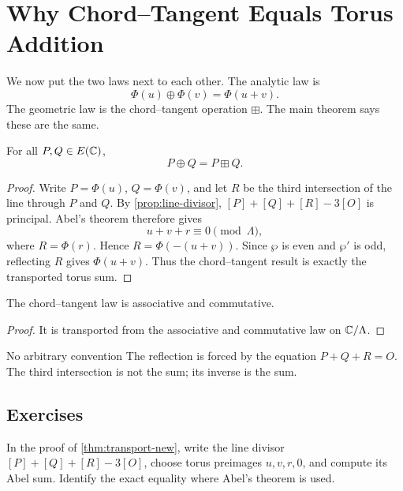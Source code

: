 \chapter{Why Chord--Tangent Equals Torus Addition}
\label{ch:transport}

We now put the two laws next to each other.  The analytic law is
\[
  \Phi(u)\oplus\Phi(v)=\Phi(u+v).
\]
The geometric law is the chord--tangent operation \(\boxplus\).  The main theorem
says these are the same.

\begin{theorem}
\label{thm:transport-new}
For all \(P,Q\in E(\mathbb{C})\),
\[
  P\oplus Q=P\boxplus Q.
\]
\end{theorem}

\begin{proof}
Write \(P=\Phi(u)\), \(Q=\Phi(v)\), and let \(R\) be the third intersection of the
line through \(P\) and \(Q\).  By \cref{prop:line-divisor},
\([P]+[Q]+[R]-3[O]\) is principal.  Abel's theorem therefore gives
\[
  u+v+r\equiv 0 \pmod{\Lambda},
\]
where \(R=\Phi(r)\).  Hence \(R=\Phi(-(u+v))\).  Since \(\wp\) is even and
\(\wp'\) is odd, reflecting \(R\) gives \(\Phi(u+v)\).  Thus the chord--tangent
result is exactly the transported torus sum.
\end{proof}

\begin{corollary}
The chord--tangent law is associative and commutative.
\end{corollary}

\begin{proof}
It is transported from the associative and commutative law on \(\mathbb{C}/\Lambda\).
\end{proof}

\begin{keyidea}{No arbitrary convention}
The reflection is forced by the equation \(P+Q+R=O\).  The third intersection is
not the sum; its inverse is the sum.
\end{keyidea}

\section*{Exercises}

\begin{exercise}
In the proof of \cref{thm:transport-new}, write the line divisor
\([P]+[Q]+[R]-3[O]\), choose torus preimages \(u,v,r,0\), and compute its Abel
sum.  Identify the exact equality where Abel's theorem is used.
\end{exercise}

